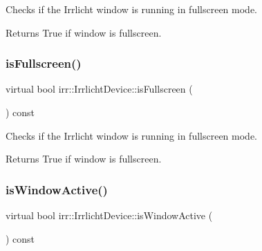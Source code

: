 Checks if the Irrlicht window is running in fullscreen mode. 

\begin{DoxyReturn}{Returns}
True if window is fullscreen. 
\end{DoxyReturn}
\mbox{\label{classirr_1_1IrrlichtDevice_a409df5e9b9b90635bd3c2db31978a5c1}} 
\subsubsection{\texorpdfstring{is\+Fullscreen()}{isFullscreen()}\hspace{0.1cm}{\footnotesize\ttfamily [2/2]}}
{\footnotesize\ttfamily virtual bool irr\+::\+Irrlicht\+Device\+::is\+Fullscreen (\begin{DoxyParamCaption}{ }\end{DoxyParamCaption}) const\hspace{0.3cm}{\ttfamily [pure virtual]}}



Checks if the Irrlicht window is running in fullscreen mode. 

\begin{DoxyReturn}{Returns}
True if window is fullscreen. 
\end{DoxyReturn}
\mbox{\label{classirr_1_1IrrlichtDevice_abd3c88336b739da2694883d5ffd25a70}} 
\subsubsection{\texorpdfstring{is\+Window\+Active()}{isWindowActive()}\hspace{0.1cm}{\footnotesize\ttfamily [1/2]}}
{\footnotesize\ttfamily virtual bool irr\+::\+Irrlicht\+Device\+::is\+Window\+Active (\begin{DoxyParamCaption}{ }\end{DoxyParamCaption}) const\hspace{0.3cm}{\ttfamily [pure virtual]}}



